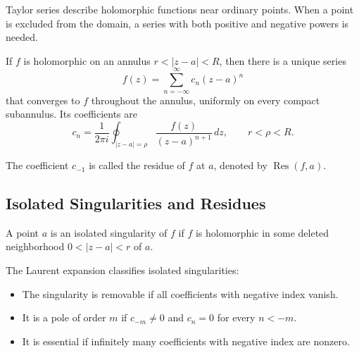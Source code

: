 Taylor series describe holomorphic functions near ordinary points. When a point is excluded from the domain, a series with both positive and negative powers is needed.

\begin{theorem}
If $f$ is holomorphic on an annulus $r<|z-a|<R$, then there is a unique series
\[
 f(z)=\sum_{n=-\infty}^{\infty}c_n(z-a)^n
\]
that converges to $f$ throughout the annulus, uniformly on every compact subannulus. Its coefficients are
\[
 c_n=\frac{1}{2\pi i}\oint_{|z-a|=\rho}
 \frac{f(z)}{(z-a)^{n+1}}\,dz,
 \qquad r<\rho<R.
\]
\end{theorem}

The coefficient $c_{-1}$ is called the residue of $f$ at $a$, denoted by $\operatorname{Res}(f,a)$.

\subsection{Isolated Singularities and Residues}

\begin{definition}
A point $a$ is an isolated singularity of $f$ if $f$ is holomorphic in some deleted neighborhood $0<|z-a|<r$ of $a$.
\end{definition}

The Laurent expansion classifies isolated singularities:
\begin{itemize}
    \item The singularity is removable if all coefficients with negative index vanish.
    \item It is a pole of order $m$ if $c_{-m}\neq 0$ and $c_n=0$ for every $n<-m$.
    \item It is essential if infinitely many coefficients with negative index are nonzero.
\end{itemize}

